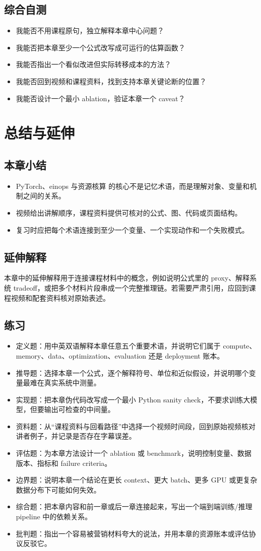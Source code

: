 \documentclass[a4paper]{article}
\begin{document}
\subsection{综合自测}
\begin{itemize}
\item 我能否不用课程原句，独立解释本章中心问题？
\item 我能否把本章至少一个公式改写成可运行的估算函数？
\item 我能否指出一个看似改进但实际转移成本的方法？
\item 我能否回到视频和课程资料，找到支持本章关键论断的位置？
\item 我能否设计一个最小 ablation，验证本章一个 caveat？
\end{itemize}
\section{总结与延伸}
\subsection{本章小结}
\begin{itemize}
\item PyTorch、einops 与资源核算 的核心不是记忆术语，而是理解对象、变量和机制之间的关系。
\item 视频给出讲解顺序，课程资料提供可核对的公式、图、代码或页面结构。
\item 复习时应把每个术语连接到至少一个变量、一个实现动作和一个失败模式。
\end{itemize}
\subsection{延伸解释}
本章中的延伸解释用于连接课程材料中的概念，例如说明公式里的 proxy、解释系统 tradeoff，或把多个材料片段串成一个完整推理链。若需要严肃引用，应回到课程视频和配套资料核对原始表述。
\subsection{练习}
\begin{itemize}
\item 定义题：用中英双语解释本章任意五个重要术语，并说明它们属于 compute、memory、data、optimization、evaluation 还是 deployment 账本。
\item 推导题：选择本章一个公式，逐个解释符号、单位和近似假设，并说明哪个变量最难在真实系统中测量。
\item 实现题：把本章伪代码改写成一个最小 Python sanity check，不要求训练大模型，但要输出可检查的中间量。
\item 资料题：从“课程资料与回看路径”中选择一个视频时间段，回到原始视频核对讲者例子，并记录是否存在字幕误差。
\item 评估题：为本章方法设计一个 ablation 或 benchmark，说明控制变量、数据版本、指标和 failure criteria。
\item 边界题：说明本章一个结论在更长 context、更大 batch、更多 GPU 或更复杂数据分布下可能如何失效。
\item 综合题：把本章内容和前一章或后一章连接起来，写出一个端到端训练/推理 pipeline 中的依赖关系。
\item 批判题：指出一个容易被营销材料夸大的说法，并用本章的资源账本或评估协议反驳它。
\end{itemize}
\end{document}
